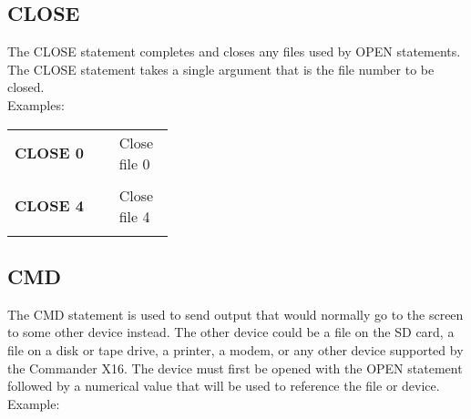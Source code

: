 
\subsection{CLOSE}

The {\ttfamily CLOSE} statement completes and closes any files used by
{\ttfamily OPEN} statements.  The {\ttfamily CLOSE} statement takes a single
argument that is the file number to be closed.\\

Examples:\\

\begin{tabular}{l p{0.35\linewidth}}

	{\ttfamily\bfseries CLOSE 0}&Close file 0\\\\

	{\ttfamily\bfseries CLOSE 4}&Close file 4\\\\

\end{tabular}

\subsection{CMD}

The {\ttfamily CMD} statement is used to send output that would normally go to
the screen to some other device instead.  The other device could be a file on
the SD card, a file on a disk or tape drive, a printer, a modem, or any other
device supported by the Commander X16.  The device must first be opened with
the {\ttfamily OPEN} statement followed by a numerical value that will be used
to reference the file or device.\\

Example:\\

